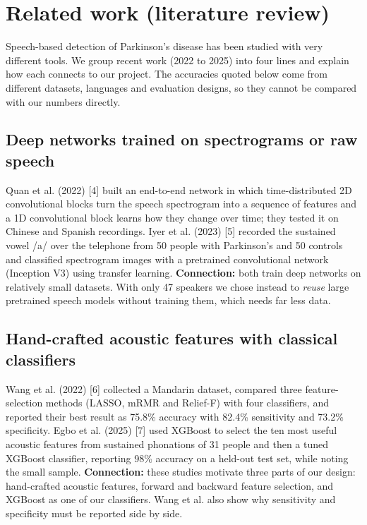 \documentclass[11pt,a4paper]{article}
\begin{document}
\section{Related work (literature review)}\label{sec:related}
Speech-based detection of Parkinson's disease has been studied with very different tools. We group recent work (2022 to 2025) into four lines and explain how each connects to our project. The accuracies quoted below come from different datasets, languages and evaluation designs, so they cannot be compared with our numbers directly.

\subsection{Deep networks trained on spectrograms or raw speech}
Quan et al. (2022) [4] built an end-to-end network in which time-distributed 2D convolutional blocks turn the speech spectrogram into a sequence of features and a 1D convolutional block learns how they change over time; they tested it on Chinese and Spanish recordings. Iyer et al. (2023) [5] recorded the sustained vowel /a/ over the telephone from 50 people with Parkinson's and 50 controls and classified spectrogram images with a pretrained convolutional network (Inception V3) using transfer learning. \textbf{Connection:} both train deep networks on relatively small datasets. With only 47 speakers we chose instead to \emph{reuse} large pretrained speech models without training them, which needs far less data.

\subsection{Hand-crafted acoustic features with classical classifiers}
Wang et al. (2022) [6] collected a Mandarin dataset, compared three feature-selection methods (LASSO, mRMR and Relief-F) with four classifiers, and reported their best result as 75.8\% accuracy with 82.4\% sensitivity and 73.2\% specificity. Egbo et al. (2025) [7] used XGBoost to select the ten most useful acoustic features from sustained phonations of 31 people and then a tuned XGBoost classifier, reporting 98\% accuracy on a held-out test set, while noting the small sample. \textbf{Connection:} these studies motivate three parts of our design: hand-crafted acoustic features, forward and backward feature selection, and XGBoost as one of our classifiers. Wang et al. also show why sensitivity and specificity must be reported side by side.
\end{document}
